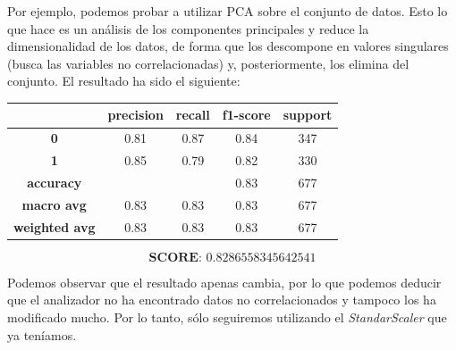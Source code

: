 \documentclass[11pt,a4paper]{article}
\begin{document}
Por ejemplo, podemos probar a utilizar PCA sobre el conjunto de datos. Esto lo que hace es un análisis de los componentes
principales y reduce la dimensionalidad de los datos, de forma que los descompone en valores singulares (busca las variables
no correlacionadas) y, posteriormente, los elimina del conjunto. El resultado ha sido el siguiente:
\begin{table}[H]
    \centering
    \begin{tabular}{c|cccc}
        \textbf{} & \textbf{precision} & \textbf{recall} & \textbf{f1-score} & \textbf{support} \\ \hline
        \textbf{0} & 0.81 & 0.87 & 0.84 & 347 \\
        \textbf{1} & 0.85 & 0.79 & 0.82 & 330 \\ \hline
        \textbf{accuracy} & & & 0.83 & 677 \\
        \textbf{macro avg} & 0.83 & 0.83 & 0.83 & 677 \\
        \textbf{weighted avg} & 0.83 & 0.83 & 0.83 & 677
    \end{tabular}
\end{table}
\vspace{-10px}
$$\textbf{SCORE:  } 0.8286558345642541$$

Podemos observar que el resultado apenas cambia, por lo que podemos deducir que el analizador no ha encontrado datos no
correlacionados y tampoco los ha modificado mucho. Por lo tanto, sólo seguiremos utilizando el \textit{StandarScaler} que ya
teníamos.
\end{document}
